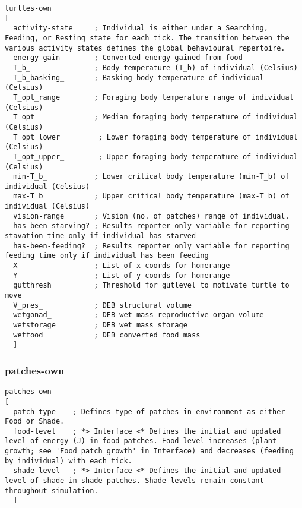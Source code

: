 \documentclass[]{article}
\begin{document}
\begin{verbatim}
turtles-own
[
  activity-state     ; Individual is either under a Searching, Feeding, or Resting state for each tick. The transition between the various activity states defines the global behavioural repertoire.
  energy-gain        ; Converted energy gained from food
  T_b_               ; Body temperature (T_b) of individual (Celsius)
  T_b_basking_       ; Basking body temperature of individual (Celsius)
  T_opt_range        ; Foraging body temperature range of individual (Celsius)
  T_opt              ; Median foraging body temperature of individual (Celsius)
  T_opt_lower_        ; Lower foraging body temperature of individual (Celsius)
  T_opt_upper_        ; Upper foraging body temperature of individual (Celsius)
  min-T_b_           ; Lower critical body temperature (min-T_b) of individual (Celsius)
  max-T_b_           ; Upper critical body temperature (max-T_b) of individual (Celsius)
  vision-range       ; Vision (no. of patches) range of individual.
  has-been-starving? ; Results reporter only variable for reporting stavation time only if individual has starved
  has-been-feeding?  ; Results reporter only variable for reporting feeding time only if individual has been feeding
  X                  ; List of x coords for homerange
  Y                  ; List of y coords for homerange
  gutthresh_         ; Threshold for gutlevel to motivate turtle to move
  V_pres_            ; DEB structural volume
  wetgonad_          ; DEB wet mass reproductive organ volume
  wetstorage_        ; DEB wet mass storage
  wetfood_           ; DEB converted food mass
  ]
\end{verbatim}

\subsubsection{patches-own}\label{patches-own}

\begin{verbatim}
patches-own
[
  patch-type    ; Defines type of patches in environment as either Food or Shade.
  food-level    ; *> Interface <* Defines the initial and updated level of energy (J) in food patches. Food level increases (plant growth; see 'Food patch growth' in Interface) and decreases (feeding by individual) with each tick.
  shade-level   ; *> Interface <* Defines the initial and updated level of shade in shade patches. Shade levels remain constant throughout simulation.
  ]
\end{verbatim}
\end{document}
